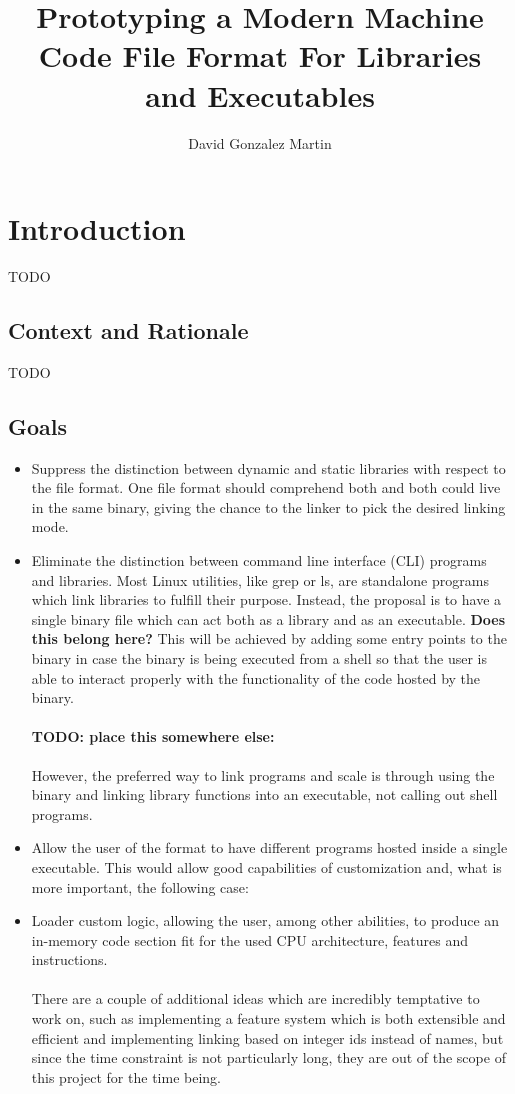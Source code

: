 \documentclass[12pt]{article}
\title{\vspace{-2.5cm}\textbf{Prototyping a Modern Machine Code File Format For Libraries and Executables}}
\author{David Gonzalez Martin}
\date{\vspace{-5ex}}
\begin{document}
	\maketitle{\vspace{-1.5cm}}
	\newpage
	\tableofcontents
	\newpage
	\section{Introduction}
    TODO
	\subsection{Context and Rationale}
	TODO
	\subsection{Goals}
	\begin{itemize}
		\item Suppress the distinction between dynamic and static libraries with respect to the file format. One file format should comprehend both and both could live in the same binary, giving the chance to the linker to pick the desired linking mode.
		\item Eliminate the distinction between command line interface (CLI) programs and libraries. Most Linux utilities, like grep or ls, are standalone programs which link libraries to fulfill their purpose. Instead, the proposal is to have a single binary file which can act both as a library and as an executable. \textbf{Does this belong here?} This will be achieved by adding some entry points to the binary in case the binary is being executed from a shell so that the user is able to interact properly with the functionality of the code hosted by the binary.
		\paragraph{TODO: place this somewhere else:}However, the preferred way to link programs and scale is through using the binary and linking library functions into an executable, not calling out shell programs.
		\item Allow the user of the format to have different programs hosted inside a single executable. This would allow good capabilities of customization and, what is more important, the following case:
		\item Loader custom logic, allowing the user, among other abilities, to produce an in-memory code section fit for the used CPU architecture, features and instructions.
		\paragraph{} There are a couple of additional ideas which are incredibly temptative to work on, such as implementing a feature system which is both extensible and efficient and implementing linking based on integer ids instead of names, but since the time constraint is not particularly long, they are out of the scope of this project for the time being.
	\end{itemize}
\end{document}
